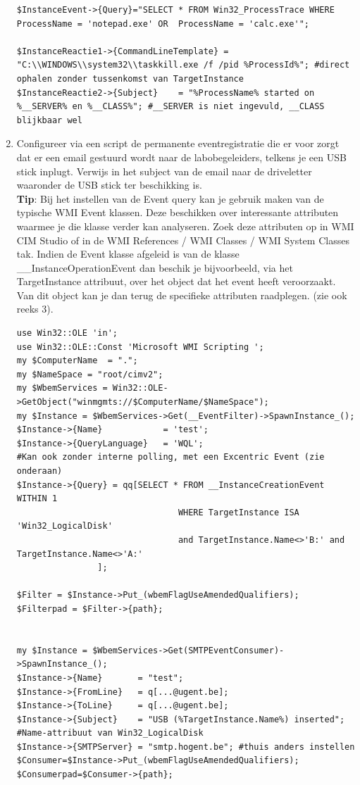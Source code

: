 \documentclass[11pt,a4paper]{report}
\begin{document}
\begin{enumerate}[resume]
\begin{lstlisting}
$InstanceEvent->{Query}="SELECT * FROM Win32_ProcessTrace WHERE ProcessName = 'notepad.exe' OR  ProcessName = 'calc.exe'";

$InstanceReactie1->{CommandLineTemplate} = "C:\\WINDOWS\\system32\\taskkill.exe /f /pid %ProcessId%"; #direct ophalen zonder tussenkomst van TargetInstance
$InstanceReactie2->{Subject}    = "%ProcessName% started on %__SERVER% en %__CLASS%"; #__SERVER is niet ingevuld, __CLASS blijkbaar wel
	\end{lstlisting}
	\item Configureer via een script de permanente eventregistratie die er voor zorgt dat er een email gestuurd wordt naar de labobegeleiders, telkens je een USB stick inplugt. Verwijs in het subject van de email naar de driveletter waaronder de USB stick ter beschikking is.
	\\\textbf{Tip}: Bij het instellen van de Event query kan je gebruik maken van de typische WMI Event klassen. Deze beschikken over interessante attributen waarmee je die klasse verder kan analyseren. Zoek deze attributen op in WMI CIM Studio of in de WMI References / WMI Classes / WMI System Classes tak. Indien de Event klasse afgeleid is van de klasse \_\_InstanceOperationEvent dan beschik je bijvoorbeeld, via het TargetInstance attribuut, over het object dat het event heeft veroorzaakt. Van dit object kan je dan terug de specifieke attributen raadplegen.
	(zie ook reeks 3).
	\begin{lstlisting}
use Win32::OLE 'in';
use Win32::OLE::Const 'Microsoft WMI Scripting ';
my $ComputerName  = ".";
my $NameSpace = "root/cimv2";
my $WbemServices = Win32::OLE->GetObject("winmgmts://$ComputerName/$NameSpace");
my $Instance = $WbemServices->Get(__EventFilter)->SpawnInstance_();
$Instance->{Name}            = 'test';
$Instance->{QueryLanguage}   = 'WQL';
#Kan ook zonder interne polling, met een Excentric Event (zie onderaan)
$Instance->{Query} = qq[SELECT * FROM __InstanceCreationEvent WITHIN 1 
								WHERE TargetInstance ISA 'Win32_LogicalDisk' 
								and TargetInstance.Name<>'B:' and TargetInstance.Name<>'A:' 
				];

$Filter = $Instance->Put_(wbemFlagUseAmendedQualifiers);
$Filterpad = $Filter->{path};


my $Instance = $WbemServices->Get(SMTPEventConsumer)->SpawnInstance_();
$Instance->{Name}       = "test";
$Instance->{FromLine}   = q[...@ugent.be];
$Instance->{ToLine}     = q[...@ugent.be];
$Instance->{Subject}    = "USB (%TargetInstance.Name%) inserted"; #Name-attribuut van Win32_LogicalDisk
$Instance->{SMTPServer} = "smtp.hogent.be"; #thuis anders instellen
$Consumer=$Instance->Put_(wbemFlagUseAmendedQualifiers);
$Consumerpad=$Consumer->{path};


\end{lstlisting}
\end{enumerate}
\end{document}
